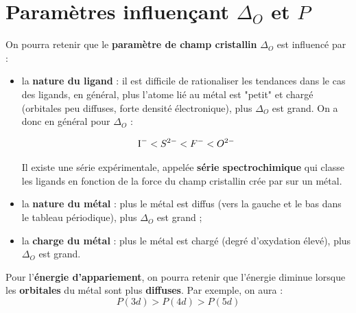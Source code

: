 \section{Paramètres influençant $\Delta_O$ et $P$}
On pourra retenir que le \textbf{paramètre de champ cristallin} $\Delta_O$ est influencé par : 
\begin{itemize}
\item la \textbf{nature du ligand} : il est difficile de rationaliser les tendances dans le cas des ligands, en général, plus l'atome lié au métal est "petit" et chargé (orbitales peu diffuses, forte densité électronique), plus $\Delta_O$ est grand. On a donc en général pour $\Delta_O$ : 

\begin{align*}
\ce{I^-}  < S^{2-}  < F^- < O^{2-}
\end{align*}

Il existe une série expérimentale, appelée \textbf{série spectrochimique} qui classe les ligands en fonction de la force du champ cristallin crée par sur un métal.

\item la \textbf{nature du métal} : plus le métal est diffus (vers la gauche et le bas dans le tableau périodique), plus $\Delta_O$ est grand ;
\item la \textbf{charge du métal} : plus le métal est chargé (degré d'oxydation élevé), plus $\Delta_O$ est grand.
\end{itemize}

Pour l'\textbf{énergie d'appariement}, on pourra retenir que l'énergie diminue lorsque les \textbf{orbitales} du métal sont plus \textbf{diffuses}. Par exemple, on aura : 
\begin{equation}
P( 3d ) > P( 4d ) > P( 5d )
\end{equation}


